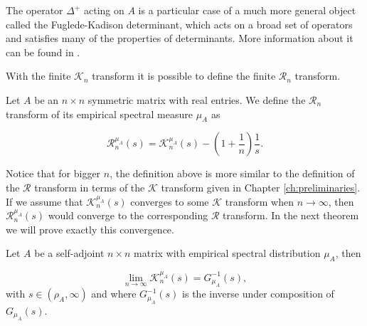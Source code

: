 The operator $\Delta^+$ acting on $A$ is a particular case of a much more general object called the Fuglede-Kadison determinant, which acts on a broad set of operators and satisfies many of the properties of determinants. More information about it can be found in \cite{article:fuglede_kadisen_determinant}.

With the finite $\mathcal K_n$ transform it is possible to define the finite $\mathcal R_n$ transform. 

\begin{definition}
    Let $A$ be an $n\times n$ symmetric matrix with real entries. We define the $\mathcal R_n$ transform of its empirical spectral measure $\mu_A$ as 

    \begin{equation*}
        \mathcal R_n^{\mu_A} (s) = \mathcal K_n^{\mu_A}(s) - \left( 1 + \frac1n \right) \frac1s.
    \end{equation*}
\end{definition}

Notice that for bigger $n$, the definition above is more similar to the definition of the $\mathcal R$ transform in terms of the $\mathcal K$ transform given in Chapter \ref{ch:preliminaries}. If we assume that $\mathcal K_n^{\mu_A}(s)$ converges to some $\mathcal K$ transform when $n\to\infty$, then $\mathcal R_n^{\mu_A}(s)$ would converge to the corresponding $\mathcal R$ transform. In the next theorem we will prove exactly this convergence.

\begin{theorem} Let $A$ be a self-adjoint $n \times n$ matrix with empirical spectral distribution $\mu_A$, then

    \begin{equation*}
        \lim_{n\to\infty} \mathcal K_n^{\mu_A} (s) = G_{\mu_A}^{-1}(s),
    \end{equation*}
\noindent with $s \in (\rho_A, \infty)$ and where $G_{\mu_A}^{-1}(s)$ is the inverse under composition of $G_{\mu_A}(s)$.
\end{theorem}

